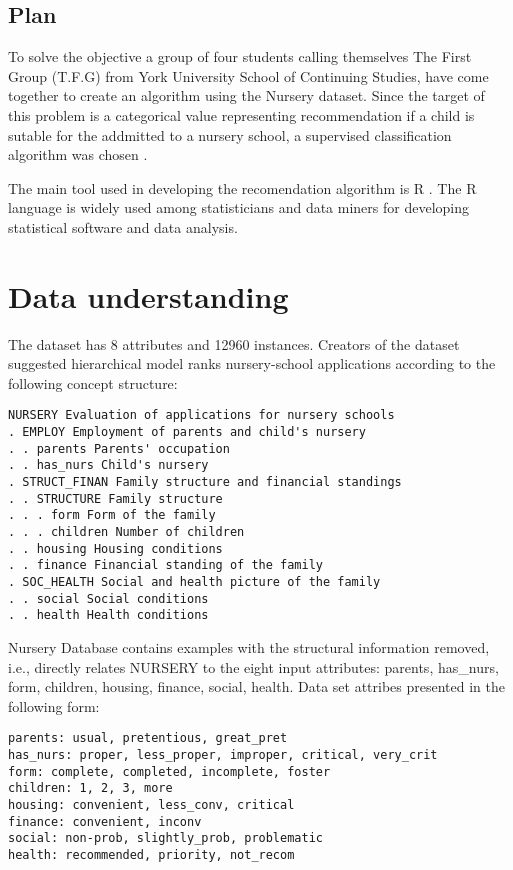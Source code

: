 \hypertarget{plan}{%
\subsection{Plan}\label{plan}}

To solve the objective a group of four students calling themselves The
First Group (T.F.G) from York University School of Continuing Studies,
have come together to create an algorithm using the Nursery dataset.
Since the target of this problem is a categorical value representing
recommendation if a child is sutable for the addmitted to a nursery
school, a supervised classification algorithm was chosen
\citep{witten_data_2011}.

The main tool used in developing the recomendation algorithm is R
\citep{R}. The R language is widely used among statisticians and data
miners for developing statistical software and data analysis.

\hypertarget{data-understanding}{%
\section{Data understanding}\label{data-understanding}}

The dataset \citep{noauthor_uci_nodate} has 8 attributes and 12960
instances. Creators of the dataset suggested hierarchical model ranks
nursery-school applications according to the following concept
structure:

\begin{verbatim}
NURSERY Evaluation of applications for nursery schools 
. EMPLOY Employment of parents and child's nursery 
. . parents Parents' occupation 
. . has_nurs Child's nursery 
. STRUCT_FINAN Family structure and financial standings 
. . STRUCTURE Family structure 
. . . form Form of the family 
. . . children Number of children 
. . housing Housing conditions 
. . finance Financial standing of the family 
. SOC_HEALTH Social and health picture of the family 
. . social Social conditions 
. . health Health conditions 
\end{verbatim}

Nursery Database contains examples with the structural information
removed, i.e., directly relates NURSERY to the eight input attributes:
parents, has\_nurs, form, children, housing, finance, social, health.
Data set attribes presented in the following form:

\begin{verbatim}
parents: usual, pretentious, great_pret 
has_nurs: proper, less_proper, improper, critical, very_crit 
form: complete, completed, incomplete, foster 
children: 1, 2, 3, more 
housing: convenient, less_conv, critical 
finance: convenient, inconv 
social: non-prob, slightly_prob, problematic 
health: recommended, priority, not_recom
\end{verbatim}

